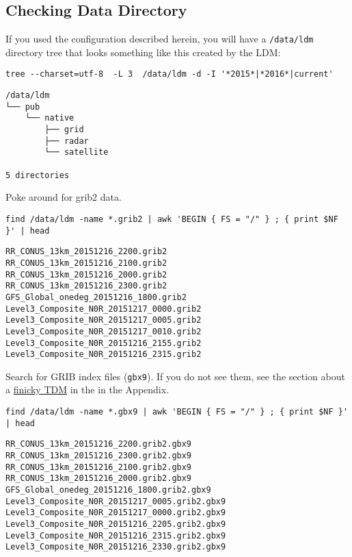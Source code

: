 \documentclass[11pt]{article}
\begin{document}
\subsection{Checking Data Directory}
\label{sec:orgheadline39}

If you used the configuration described herein, you will have a \texttt{/data/ldm} directory tree that looks something like this created by the LDM:

\begin{verbatim}
tree --charset=utf-8  -L 3  /data/ldm -d -I '*2015*|*2016*|current'
\end{verbatim}

\begin{verbatim}
/data/ldm
└── pub
    └── native
        ├── grid
        ├── radar
        └── satellite

5 directories
\end{verbatim}

Poke around for grib2 data.

\begin{verbatim}
find /data/ldm -name *.grib2 | awk 'BEGIN { FS = "/" } ; { print $NF }' | head
\end{verbatim}

\begin{verbatim}
RR_CONUS_13km_20151216_2200.grib2
RR_CONUS_13km_20151216_2100.grib2
RR_CONUS_13km_20151216_2000.grib2
RR_CONUS_13km_20151216_2300.grib2
GFS_Global_onedeg_20151216_1800.grib2
Level3_Composite_N0R_20151217_0000.grib2
Level3_Composite_N0R_20151217_0005.grib2
Level3_Composite_N0R_20151217_0010.grib2
Level3_Composite_N0R_20151216_2155.grib2
Level3_Composite_N0R_20151216_2315.grib2
\end{verbatim}

Search for GRIB index files (\texttt{gbx9}). If you do not see them, see the section about a \hyperref[orgtarget6]{finicky TDM} in the in the Appendix.

\begin{verbatim}
find /data/ldm -name *.gbx9 | awk 'BEGIN { FS = "/" } ; { print $NF }' | head
\end{verbatim}

\begin{verbatim}
RR_CONUS_13km_20151216_2200.grib2.gbx9
RR_CONUS_13km_20151216_2300.grib2.gbx9
RR_CONUS_13km_20151216_2100.grib2.gbx9
RR_CONUS_13km_20151216_2000.grib2.gbx9
GFS_Global_onedeg_20151216_1800.grib2.gbx9
Level3_Composite_N0R_20151217_0005.grib2.gbx9
Level3_Composite_N0R_20151217_0000.grib2.gbx9
Level3_Composite_N0R_20151216_2205.grib2.gbx9
Level3_Composite_N0R_20151216_2315.grib2.gbx9
Level3_Composite_N0R_20151216_2330.grib2.gbx9
\end{verbatim}
\end{document}
